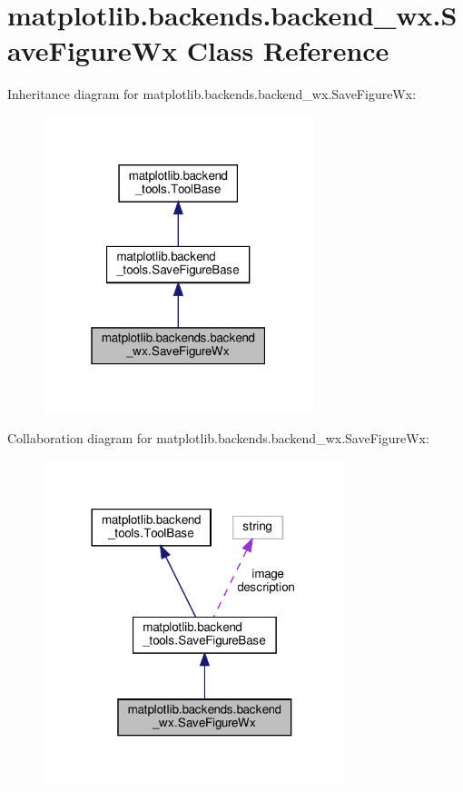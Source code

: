 \hypertarget{classmatplotlib_1_1backends_1_1backend__wx_1_1SaveFigureWx}{}\section{matplotlib.\+backends.\+backend\+\_\+wx.\+Save\+Figure\+Wx Class Reference}
\label{classmatplotlib_1_1backends_1_1backend__wx_1_1SaveFigureWx}


Inheritance diagram for matplotlib.\+backends.\+backend\+\_\+wx.\+Save\+Figure\+Wx\+:
\nopagebreak
\begin{figure}[H]
\begin{center}
\leavevmode
\includegraphics[width=223pt]{classmatplotlib_1_1backends_1_1backend__wx_1_1SaveFigureWx__inherit__graph}
\end{center}
\end{figure}


Collaboration diagram for matplotlib.\+backends.\+backend\+\_\+wx.\+Save\+Figure\+Wx\+:
\nopagebreak
\begin{figure}[H]
\begin{center}
\leavevmode
\includegraphics[width=248pt]{classmatplotlib_1_1backends_1_1backend__wx_1_1SaveFigureWx__coll__graph}
\end{center}
\end{figure}
